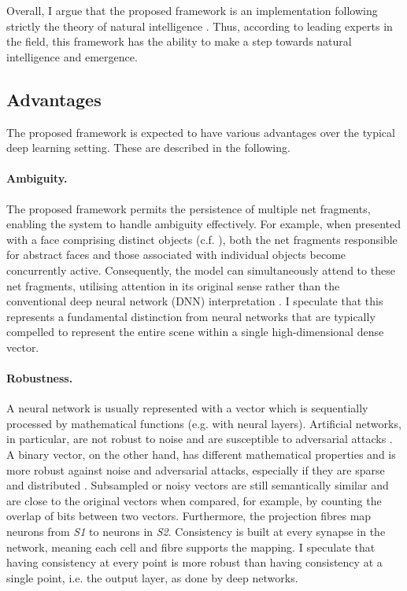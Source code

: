 Overall, I argue that the proposed framework is an implementation following strictly the theory of natural intelligence \cite{von_der_malsburg_theory_2022}. Thus, according to leading experts in the field, this framework has the ability to make a step towards natural intelligence and emergence. 

\subsection{Advantages}
The proposed framework is expected to have various advantages over the typical deep learning setting. These are described in the following.

\paragraph{Ambiguity.} The proposed framework permits the persistence of multiple net fragments, enabling the system to handle ambiguity effectively. For example, when presented with a face comprising distinct objects (c.f. ), both the net fragments responsible for abstract faces and those associated with individual objects become concurrently active. Consequently, the model can simultaneously attend to these net fragments, utilising attention in its original sense rather than the conventional deep neural network (DNN) interpretation . I speculate that this represents a fundamental distinction from neural networks that are typically compelled to represent the entire scene within a single high-dimensional dense vector.

\paragraph{Robustness.} A neural network is usually represented with a vector which is sequentially processed by mathematical functions (e.g. with neural layers). Artificial networks, in particular, are not robust to noise and are susceptible to adversarial attacks . A binary vector, on the other hand, has different mathematical properties and is more robust against noise and adversarial attacks, especially if they are sparse and distributed .
Subsampled or noisy vectors are still semantically similar and are close to the original vectors when compared, for example, by counting the overlap of bits between two vectors.
Furthermore, the projection fibres map neurons from \emph{S1} to neurons in \emph{S2}. Consistency is built at every synapse in the network, meaning each cell and fibre supports the mapping. I speculate that having consistency at every point is more robust than having consistency at a single point, i.e. the output layer, as done by deep networks.

